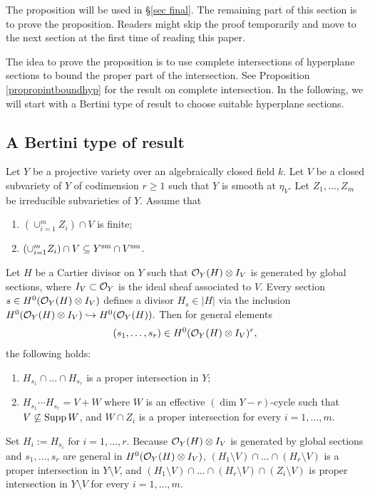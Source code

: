 The proposition will be used in \S\ref{sec final}.
The remaining part of this section is to prove the proposition.
Readers might skip the proof temporarily and move to the next section at the first time of reading this paper.

The idea to prove the proposition is to use complete intersections of hyperplane sections to bound the proper part of the intersection. See Proposition \ref{propropintboundhyp} for the result on complete intersection.
In the following, we will start with a Bertini type of result to choose suitable hyperplane sections.


\subsection{A Bertini type of result}

\begin{pro}\label{probertini}Let $Y$ be a projective variety over an algebraically closed field $k$.
Let $V$ be a closed subvariety of $Y$ of codimension $r\geq 1$ such that $Y$ is smooth at $\eta_V.$
Let $Z_1,\dots,Z_m$ be irreducible subvarieties of $Y$.
Assume that
\begin{enumerate}
\item[$\bullet$] $(\cup_{i=1}^m Z_i)\cap V$ is finite;
\item[$\bullet$] $(\cup_{i=1}^m Z_i)\cap V\subseteq Y^{{\rm sm}}\cap V^{{\rm sm}}$.
\end{enumerate}
Let $H$ be a Cartier divisor on $Y$ such that ${\mathcal O}_Y(H)\otimes I_V$ is generated by global sections, where
 $I_V\subset {\mathcal O}_Y$ is the ideal sheaf associated to $V$.
Every section $s\in H^0({\mathcal O}_Y(H)\otimes I_V)$ defines a divisor
$H_s\in |H|$ via the inclusion $H^0({\mathcal O}_Y(H)\otimes I_V)\hookrightarrow H^0({\mathcal O}_Y(H)).$
Then for general elements
$$(s_1,\dots, s_r)\in H^0({\mathcal O}_Y(H)\otimes I_V)^r,$$
the following holds:
\begin{enumerate}
\item $H_{s_1}\cap\dots\cap H_{s_r}$ is a proper intersection in $Y$;
\item $H_{s_1}\cdots H_{s_r}=V+W$ where $W$ is an effective $(\dim Y-r)$-cycle such that
$V\not\subseteq {\rm Supp} \,W$, and $W\cap Z_i$ is a proper intersection for every $i=1,\dots,m$.
\end{enumerate}
\end{pro}


\proof
Set $H_i:=H_{s_i}$ for $i=1,\dots,r.$
Because ${\mathcal O}_Y(H)\otimes I_V$ is generated by global sections and $s_1,\dots, s_r$ are general in $H^0({\mathcal O}_Y(H)\otimes I_V)$,
$(H_1\setminus V)\cap\dots\cap  (H_r\setminus V)$ is a proper intersection in $Y\setminus V$, and
$(H_1\setminus V)\cap\dots\cap  (H_r\setminus V)\cap (Z_i\setminus V)$ is proper intersection in $Y\setminus V$ for every $i=1,\dots,m$.



